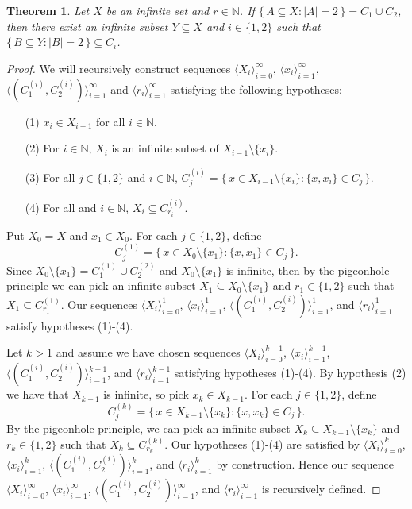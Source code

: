 \documentclass[12pt]{article}
\theoremstyle{plain}
\newtheorem{thm}{Theorem}[section]
\theoremstyle{definition}
\newcommand{\la}{\langle}
\newcommand{\ra}{\rangle}
\newcommand{\bbN}{\mathbb{N}}
\begin{document}
\begin{thm}
  \label{thm:ramsey2Col}
  Let $X$ be an infinite set and $r \in \bbN$.
  If $\{\, A \subseteq X : |A| = 2 \,\} = C_1 \cup C_2$, then there
  exist an infinite subset $Y \subseteq X$ and $i \in \{1, 2\}$ such
  that $\{\, B \subseteq Y : |B| = 2 \,\} \subseteq C_i$.
\end{thm}
\begin{proof}
  We will recursively construct sequences $\la X_i \ra_{i=0}^\infty$,
  $\la x_i \ra_{i=1}^\infty$, $\la (C_1^{(i)}, C_2^{(i)})
  \ra_{i=1}^\infty$ and $\la r_i \ra_{i=1}^\infty$ satisfying the
  following hypotheses:
  \begin{itemize}
    \item[(1)] $x_i \in X_{i-1}$ for all $i \in \bbN$.
      
    \item[(2)] For $i \in \bbN$, $X_i$ is an infinite subset of
      $X_{i-1} \setminus \{x_i\}$.

    \item[(3)] For all $j \in \{1, 2\}$ and $i \in \bbN$, $C_j^{(i)} =
      \bigl\{\, x \in X_{i-1} \setminus \{x_i\} : \{x, x_i\} \in C_j
      \,\bigr\}$.

    \item[(4)] For all and $i \in \bbN$, $X_i
      \subseteq C_{r_i}^{(i)}$.
  \end{itemize}
  
  Put $X_0 = X$ and $x_1 \in X_0$.
  For each $j \in \{1,2\}$, define
  \[
    C_j^{(1)} = \bigl\{\, x \in X_0 \setminus \{x_1\} : \{x, x_1\} \in
    C_j \,\bigr\}.
  \]
  Since $X_0 \setminus \{x_1\} = C_1^{(1)} \cup C_2^{(2)}$ and $X_0
  \setminus \{x_1\}$ is infinite, then by the pigeonhole principle we
  can pick an infinite subset $X_1 \subseteq X_0 \setminus \{x_1\}$
  and $r_1 \in \{1, 2\}$ such that $X_1 \subseteq C_{r_1}^{(1)}$.
  Our sequences $\la X_i \ra_{i=0}^1$, $\la x_i \ra_{i=1}^1$, $\la
  (C_1^{(i)}, C_2^{(i)}) \ra_{i=1}^1$, and $\la r_i \ra_{i=1}^1$
  satisfy hypotheses (1)-(4).

  Let $k > 1$ and assume we have chosen sequences $\la X_i
  \ra_{i=0}^{k-1}$, $\la x_i \ra_{i=1}^{k-1}$, $\la (C_1^{(i)}, C_2^{(i)})
  \ra_{i=1}^{k-1}$, and $\la r_i \ra_{i=1}^{k-1}$ satisfying
  hypotheses (1)-(4).
  By hypothesis (2) we have that $X_{k-1}$ is infinite, so pick $x_k
  \in X_{k-1}$.
  For each $j \in \{1, 2\}$, define
  \[
    C_j^{(k)} = \bigl\{\, x \in X_{k-1} \setminus \{x_k\} : \{x, x_k\} \in
    C_j \,\bigr\}.
  \]
  By the pigeonhole principle, we can pick an infinite subset $X_k
  \subseteq X_{k-1} \setminus \{x_k\}$ and $r_k \in \{1, 2\}$ such
  that $X_k \subseteq C_{r_k}^{(k)}$.
  Our hypotheses (1)-(4) are satisfied by $\la X_i
  \ra_{i=0}^{k}$, $\la x_i \ra_{i=1}^{k}$, $\la (C_1^{(i)}, C_2^{(i)})
  \ra_{i=1}^{k}$, and $\la r_i \ra_{i=1}^{k}$ by construction. 
  Hence our sequence $\la X_i \ra_{i=0}^{\infty}$, $\la x_i
  \ra_{i=1}^{\infty}$, $\la (C_1^{(i)}, C_2^{(i)}) \ra_{i=1}^{\infty}$, and
  $\la r_i \ra_{i=1}^{\infty}$ is recursively defined.


\end{proof}
\end{document}
